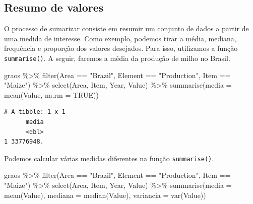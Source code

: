 \documentclass[
  brazilian,
]{book}
\newenvironment{Shaded}{\begin{snugshade}}{\end{snugshade}}
\newcommand{\AttributeTok}[1]{\textcolor[rgb]{0.77,0.63,0.00}{#1}}
\newcommand{\ConstantTok}[1]{\textcolor[rgb]{0.00,0.00,0.00}{#1}}
\newcommand{\FunctionTok}[1]{\textcolor[rgb]{0.00,0.00,0.00}{#1}}
\newcommand{\NormalTok}[1]{#1}
\newcommand{\SpecialCharTok}[1]{\textcolor[rgb]{0.00,0.00,0.00}{#1}}
\newcommand{\StringTok}[1]{\textcolor[rgb]{0.31,0.60,0.02}{#1}}
\begin{document}
\hypertarget{resumo-de-valores}{%
\subsection{Resumo de valores}\label{resumo-de-valores}}

O processo de sumarizar consiste em resumir um conjunto de dados a partir de uma medida de interesse. Como exemplo, podemos tirar a média, mediana, frequência e proporção dos valores desejados. Para isso, utilizamos a função \texttt{summarise()}. A seguir, faremos a média da produção de milho no Brasil.

\begin{Shaded}
\begin{Highlighting}[]
\NormalTok{graos }\SpecialCharTok{\%\textgreater{}\%} 
  \FunctionTok{filter}\NormalTok{(Area }\SpecialCharTok{==} \StringTok{"Brazil"}\NormalTok{,}
\NormalTok{         Element }\SpecialCharTok{==} \StringTok{"Production"}\NormalTok{,}
\NormalTok{         Item }\SpecialCharTok{==} \StringTok{"Maize"}\NormalTok{) }\SpecialCharTok{\%\textgreater{}\%} 
  \FunctionTok{select}\NormalTok{(Area, Item, Year, Value) }\SpecialCharTok{\%\textgreater{}\%} 
  \FunctionTok{summarise}\NormalTok{(}\AttributeTok{media =} \FunctionTok{mean}\NormalTok{(Value, }\AttributeTok{na.rm =} \ConstantTok{TRUE}\NormalTok{))}
\end{Highlighting}
\end{Shaded}

\begin{verbatim}
# A tibble: 1 x 1
      media
      <dbl>
1 33776948.
\end{verbatim}

Podemos calcular várias medidas diferentes na função \texttt{summarise()}.

\begin{Shaded}
\begin{Highlighting}[]
\NormalTok{graos }\SpecialCharTok{\%\textgreater{}\%} 
  \FunctionTok{filter}\NormalTok{(Area }\SpecialCharTok{==} \StringTok{"Brazil"}\NormalTok{,}
\NormalTok{         Element }\SpecialCharTok{==} \StringTok{"Production"}\NormalTok{,}
\NormalTok{         Item }\SpecialCharTok{==} \StringTok{"Maize"}\NormalTok{) }\SpecialCharTok{\%\textgreater{}\%} 
  \FunctionTok{select}\NormalTok{(Area, Item, Year, Value) }\SpecialCharTok{\%\textgreater{}\%} 
  \FunctionTok{summarise}\NormalTok{(}\AttributeTok{media =} \FunctionTok{mean}\NormalTok{(Value),}
            \AttributeTok{mediana =} \FunctionTok{median}\NormalTok{(Value),}
            \AttributeTok{variancia =} \FunctionTok{var}\NormalTok{(Value))}
\end{Highlighting}
\end{Shaded}
\end{document}
